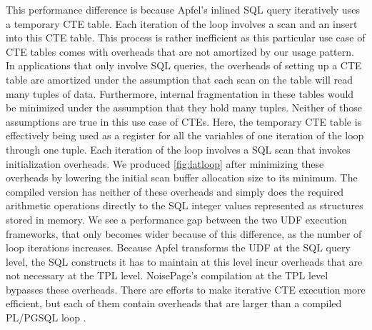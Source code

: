 \documentclass[12pt]{cmuthesis}
\begin{document}
    This performance difference is because Apfel's inlined SQL query iteratively uses a temporary CTE table. Each iteration of the loop involves a scan and an insert into this CTE table. This process is rather inefficient as this particular use case of CTE tables comes with overheads that are not amortized by our usage pattern.\\
    
    In applications that only involve SQL queries, the overheads of setting up a CTE table are amortized under the assumption that each scan on the table will read many tuples of data.
    Furthermore, internal fragmentation in these tables would be minimized under the assumption that they hold many tuples. Neither of those assumptions are true in this use case of CTEs. Here, the temporary CTE table is effectively being used as a register for all the variables of one iteration of the loop through one tuple. Each iteration of the loop involves a SQL scan that invokes initialization overheads. We produced \cref{fig:latloop} after minimizing these overheads by lowering the initial scan buffer allocation size to its minimum. The compiled version has neither of these overheads and simply does the required arithmetic operations directly to the SQL integer values represented as structures stored in memory. We see a performance gap between the two UDF execution frameworks, that only becomes wider because of this difference, as the number of loop iterations increases. Because Apfel transforms the UDF at the SQL query level, the SQL constructs it has to maintain at this level incur overheads that are not necessary at the TPL level. NoisePage’s compilation at the TPL level bypasses these overheads. There are efforts to make iterative CTE execution more efficient, but each of them contain overheads that are larger than a compiled PL/PGSQL loop \cite{floratos18, Ghazal12}.\\
\end{document}

